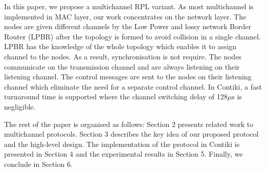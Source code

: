 
In this paper, we propose a multichannel RPL variant. As most multichannel is implemented in MAC layer, our work concentrates on the network layer. The nodes are given different channels by the Low Power and lossy network Border Router (LPBR) after the topology is formed to avoid collision in a single channel. LPBR has the knowledge of the whole topology which enables it to assign channel to the nodes. As a result, synchronisation is not require. The nodes communicate on the transmission channel and are always listening on their listening channel. The control messages are sent to the nodes on their listening channel which eliminate the need for a separate control channel. In Contiki, a fast turnaround time is supported where the channel switching delay of 128$\mu$s is negligible.

The rest of the paper is organised as follows: Section 2 presents related work to multichannel protocols. Section 3 describes the key idea of our proposed protocol and the high-level design. The implementation of the protocol in Contiki is presented in Section 4 and the experimental results in Section 5. Finally, we conclude in Section 6.

%